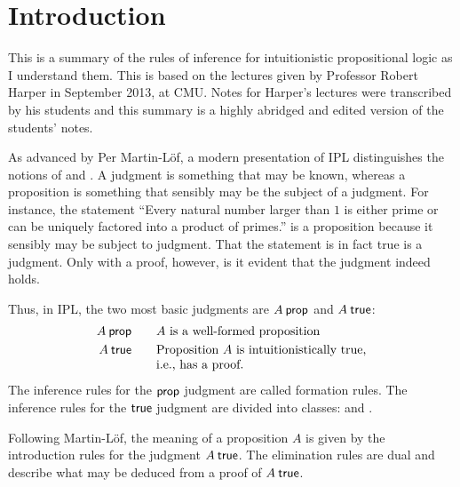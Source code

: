 \documentclass[12pt]{article}
\begin{document}


\section{Introduction}

This is a summary of the rules of inference for intuitionistic propositional
logic as I understand them.  This is based on the lectures given by Professor
Robert Harper in September 2013, at CMU. Notes for Harper's lectures were transcribed
by his students and this summary is a highly abridged and edited version of the
students' notes. 

As advanced by Per Martin-L\"{o}f, a modern presentation of \acf{IPL}
distinguishes the notions of  and . A
judgment is something that may be known, whereas a proposition is something that
sensibly may be the subject of a judgment. For instance, the statement ``Every
natural number larger than $1$ is either prime or can be uniquely factored into
a product of primes\@.'' is a proposition because it sensibly may be subject to
judgment. That the statement is in fact true is a judgment.
Only with a proof, however, is it evident that the judgment indeed holds.

Thus, in \ac{IPL}, the two most basic judgments are $A \prop$ and $A \true$:
\begin{alignat*}{2}
  A \prop &&\quad& \text{$A$ is a well-formed proposition} \\
  A \true &&& \text{\begin{tabular}[t]{@{}l@{}}
                Proposition $A$ is intuitionistically true, \\
                i.e., has a proof.
              \end{tabular}}
\end{alignat*}
The inference rules for the $\prop$ judgment are called formation rules.
The inference rules for the $\true$ judgment are divided into classes:
 and . 

Following Martin-L\"{o}f, the meaning of a proposition $A$ is given by the
introduction rules for the judgment $A \true$. The elimination rules are dual
and  describe what may be deduced from a proof of $A \true$. 
\end{document}
